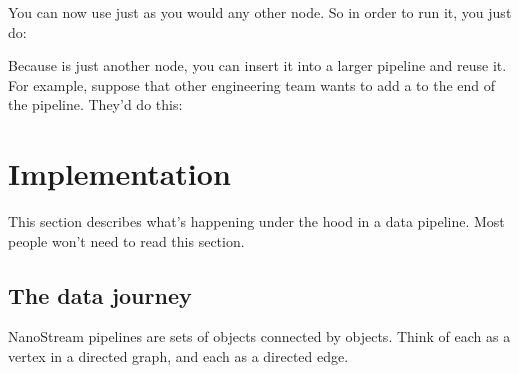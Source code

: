 \documentclass[letterpaper,10pt,english]{sphinxmanual}
\begin{document}
%
\begin{sphinxVerbatim}[commandchars=\\\{\}]
   
  
\end{sphinxVerbatim}

You can now use  just as you would any other node. So in
order to run it, you just do:

%
\begin{sphinxVerbatim}[commandchars=\\\{\}]
\end{sphinxVerbatim}

Because  is just another node, you can insert it into a
larger pipeline and reuse it. For example, suppose that other
engineering team wants to add a  to the end of the
pipeline. They’d do this:

%
\begin{sphinxVerbatim}[commandchars=\\\{\}]
  
  
\end{sphinxVerbatim}


\chapter{Implementation}
\label{\detokenize{implementation:implementation}}\label{\detokenize{implementation::doc}}
This section describes what’s happening under the hood in a 
data pipeline. Most people won’t need to read this section.


\section{The data journey}
\label{\detokenize{implementation:the-data-journey}}
NanoStream pipelines are sets of  objects connected by 
objects. Think of each  as a vertex in a directed graph, and each
 as a directed edge.
\end{document}
